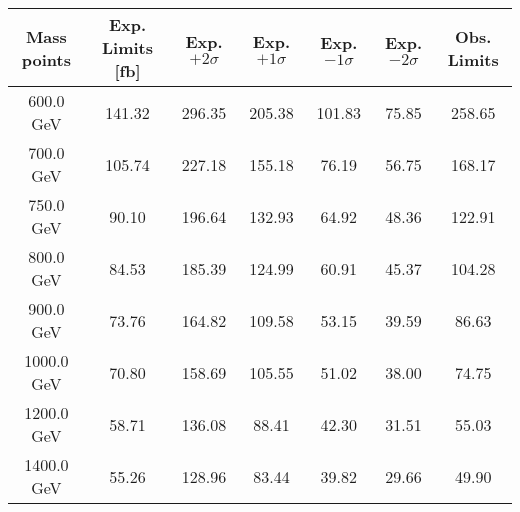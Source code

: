
\begin{table}
\begin{center}
\begin{tabular}{c|cccccc}
\hline
\hline
Mass points & Exp. Limits [fb] & Exp. $+2\sigma$ & Exp. $+1\sigma$ &  Exp. $-1\sigma$  &  Exp. $-2\sigma$ & Obs. Limits \\
\hline
600.0 GeV  &  141.32  & 296.35  & 205.38  & 101.83  & 75.85   & 258.65\\
700.0 GeV  &  105.74  & 227.18  & 155.18  & 76.19  & 56.75   & 168.17\\
750.0 GeV  &  90.10  & 196.64  & 132.93  & 64.92  & 48.36   & 122.91\\
800.0 GeV  &  84.53  & 185.39  & 124.99  & 60.91  & 45.37   & 104.28\\
900.0 GeV  &  73.76  & 164.82  & 109.58  & 53.15  & 39.59   & 86.63\\
1000.0 GeV  &  70.80  & 158.69  & 105.55  & 51.02  & 38.00   & 74.75\\
1200.0 GeV  &  58.71  & 136.08  & 88.41  & 42.30  & 31.51   & 55.03\\
1400.0 GeV  &  55.26  & 128.96  & 83.44  & 39.82  & 29.66   & 49.90\\

\hline
\hline
\end{tabular}
\end{center}
\end{table}
